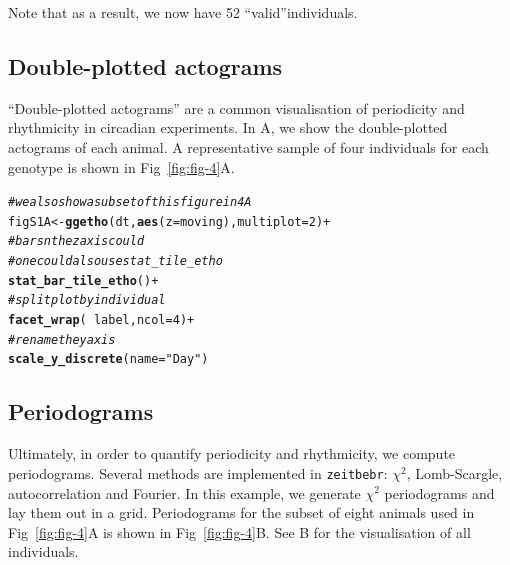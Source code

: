 \documentclass[10pt,letterpaper]{article}\usepackage[]{graphicx}\usepackage[]{color}
\makeatletter
\newcommand{\hlnum}[1]{\textcolor[rgb]{0.686,0.059,0.569}{#1}}%
\newcommand{\hlstr}[1]{\textcolor[rgb]{0.192,0.494,0.8}{#1}}%
\newcommand{\hlcom}[1]{\textcolor[rgb]{0.678,0.584,0.686}{\textit{#1}}}%
\newcommand{\hlopt}[1]{\textcolor[rgb]{0,0,0}{#1}}%
\newcommand{\hlstd}[1]{\textcolor[rgb]{0.345,0.345,0.345}{#1}}%
\newcommand{\hlkwb}[1]{\textcolor[rgb]{0.69,0.353,0.396}{#1}}%
\newcommand{\hlkwc}[1]{\textcolor[rgb]{0.333,0.667,0.333}{#1}}%
\newcommand{\hlkwd}[1]{\textcolor[rgb]{0.737,0.353,0.396}{\textbf{#1}}}%
\newenvironment{kframe}{%
 \def\at@end@of@kframe{}%
 \ifinner\ifhmode%
  \def\at@end@of@kframe{\end{minipage}}%
  \begin{minipage}{\columnwidth}%
 \fi\fi%
 \def\FrameCommand##1{\hskip\@totalleftmargin \hskip-\fboxsep
 \colorbox{shadecolor}{##1}\hskip-\fboxsep
     \hskip-\linewidth \hskip-\@totalleftmargin \hskip\columnwidth}%
 \MakeFramed {\advance\hsize-\width
   \@totalleftmargin\z@ \linewidth\hsize
   \@setminipage}}%
 {\par\unskip\endMakeFramed%
 \at@end@of@kframe}
\newenvironment{knitrout}{}{} %
\makeatother
\begin{document}
Note that as a result, we now have 52 ``valid''individuals.


\subsection*{Double-plotted actograms}
``Double-plotted actograms'' are a common visualisation of periodicity and rhythmicity in circadian experiments.
In  A, we show the double-plotted actograms of each animal.
A representative sample of four individuals for each genotype is shown in Fig~\ref{fig:fig-4}A.

\begin{knitrout}
\color{fgcolor}\begin{kframe}
\begin{alltt}
\hlcom{# we also show a subset of this figure in 4A}
\hlstd{figS1A} \hlkwb{<-} \hlkwd{ggetho}\hlstd{(dt,} \hlkwd{aes}\hlstd{(}\hlkwc{z} \hlstd{= moving),} \hlkwc{multiplot} \hlstd{=} \hlnum{2}\hlstd{)} \hlopt{+}
            \hlcom{# bars n the z axis could }
            \hlcom{# one could also use stat_tile_etho}
            \hlkwd{stat_bar_tile_etho}\hlstd{()} \hlopt{+}
            \hlcom{# split plot by individual}
            \hlkwd{facet_wrap}\hlstd{(} \hlopt{~} \hlstd{label,} \hlkwc{ncol} \hlstd{=} \hlnum{4}\hlstd{)} \hlopt{+}
            \hlcom{# rename the y axis}
            \hlkwd{scale_y_discrete}\hlstd{(}\hlkwc{name} \hlstd{=} \hlstr{"Day"}\hlstd{)}
\end{alltt}
\end{kframe}
\end{knitrout}




\subsection*{Periodograms}
Ultimately, in order to quantify periodicity and rhythmicity, we compute periodograms.
Several methods are implemented in \texttt{zeitbebr}: $\chi{}^2$, Lomb-Scargle, autocorrelation 
and Fourier.
In this example, we generate $\chi{}^2$ periodograms and lay them out in a grid.
Periodograms for the subset of eight animals used in Fig~\ref{fig:fig-4}A is shown in Fig~\ref{fig:fig-4}B. 
See B for the visualisation of all individuals.
\end{document}
